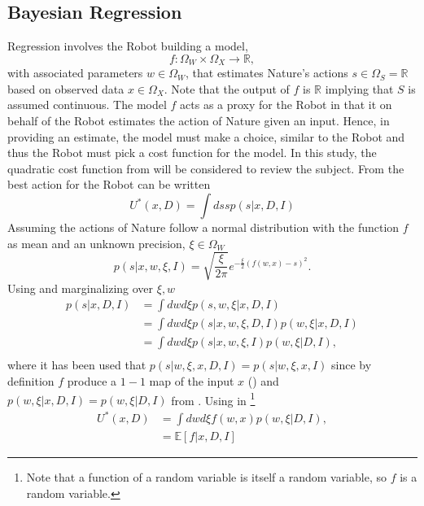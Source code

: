 \subsection{Bayesian Regression}
\label{chp:regression}
Regression involves the Robot building a model,
\begin{equation}
	f: \Omega_W\times \Omega_X\to\mathbb{R},
\end{equation} 
with associated parameters $w\in \Omega_W$, that estimates Nature's actions $s\in \Omega_S=\mathbb{R}$ based on observed data $x\in \Omega_X$. Note that the output of $f$ is $\mathbb{R}$ implying that $S$ is assumed continuous. The model $f$ acts as a proxy for the Robot in that it on behalf of the Robot estimates the action of Nature given an input. Hence, in providing an estimate, the model must make a choice, similar to the Robot and thus the Robot must pick a cost function for the model. In this study, the quadratic cost function from  will be considered to review the subject. From  the best action for the Robot can be written
\begin{equation}
	U^*(x,D) = \int ds s p(s|x,D,I)
	\label{eq:q1}
\end{equation}
Assuming the actions of Nature follow a normal distribution with the function $f$ as mean and an unknown precision, $\xi\in \Omega_W$
\begin{equation}
	p(s|x,w,\xi,I)=\sqrt{\frac{\xi}{2\pi}} e^{-\frac{\xi}{2}(f(w,x)-s)^2}.
	\label{f_dist}
\end{equation}
Using  and marginalizing over $\xi,w$
\begin{equation}
	\begin{split}
		p(s|x,D,I) &= \int dw d\xi p(s,w,\xi|x,D,I)\\
		& = \int dw d\xi p(s|x,w,\xi,D,I)  p(w,\xi|x,D,I)\\
		& = \int dw d\xi p(s|x,w,\xi,I)  p(w,\xi|D,I),\\
	\end{split}
	\label{eq:q2}
\end{equation}
where it has been used that $p(s|w,\xi,x,D,I) = p(s|w,\xi,x,I)$ since by definition $f$ produce a $1-1$ map of the input $x$ () and $p(w,\xi|x,D,I) = p(w,\xi|D,I)$ from . Using  in \footnote{Note that a function of a random variable is itself a random variable, so $f$ is a random variable.}
\begin{equation}
	\begin{split}
		U^*(x,D) & = \int dw d\xi f(w,x)  p(w,\xi|D,I),\\
		& = \mathbb{E}[f|x,D,I]
	\end{split}
	\label{eq:q3}
\end{equation}	
